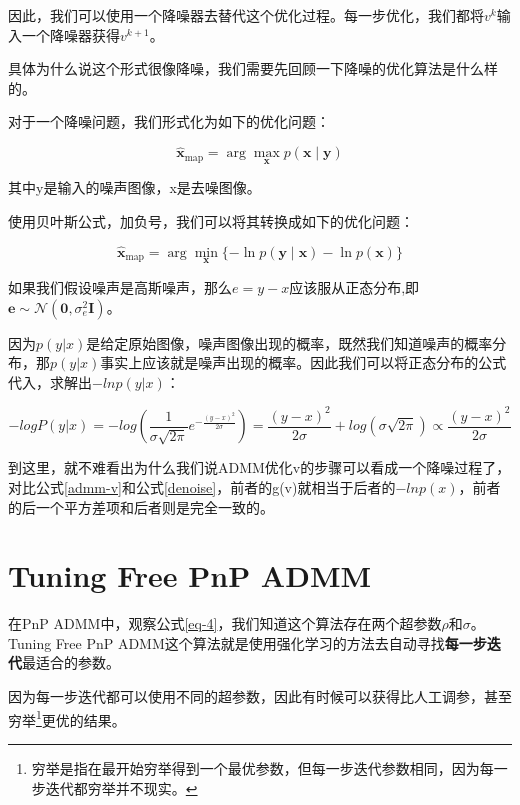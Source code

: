 \documentclass[10pt]{report}
\begin{document}
因此，我们可以使用一个降噪器去替代这个优化过程。每一步优化，我们都将$v^{k}$输入一个降噪器获得$v^{k+1}$。

具体为什么说这个形式很像降噪，我们需要先回顾一下降噪的优化算法是什么样的。

对于一个降噪问题，我们形式化为如下的优化问题：

\begin{equation}
\widehat{\boldsymbol{x}}_{\operatorname{map}}=\arg \max _{\boldsymbol{x}} p(\boldsymbol{x} \mid \boldsymbol{y})
\end{equation}

其中y是输入的噪声图像，x是去噪图像。

使用贝叶斯公式，加负号，我们可以将其转换成如下的优化问题：

\begin{equation}
\widehat{\boldsymbol{x}}_{\operatorname{map}}=\arg \min _{\boldsymbol{x}}\{-\ln p(\boldsymbol{y} \mid \boldsymbol{x})-\ln p(\boldsymbol{x})\}
\label{denoise}
\end{equation}

如果我们假设噪声是高斯噪声，那么$e=y-x$应该服从正态分布,即$\boldsymbol{e} \sim \mathcal{N}\left(\mathbf{0}, \sigma_{e}^{2} \boldsymbol{I}\right)$。

因为$p(y|x)$是给定原始图像，噪声图像出现的概率，既然我们知道噪声的概率分布，那$p(y|x)$事实上应该就是噪声出现的概率。因此我们可以将正态分布的公式代入，求解出$-ln p(y|x)$：

$$- logP(y|x) = -log(\frac{1}{\sigma\sqrt{2\pi}}e^{-\frac{(y-x)^2}{2\sigma}})=\frac{(y-x)^2}{2\sigma}+log(\sigma\sqrt{2\pi})\propto \frac{(y-x)^2}{2\sigma}$$

到这里，就不难看出为什么我们说ADMM优化v的步骤可以看成一个降噪过程了，对比公式\ref{admm-v}和公式\ref{denoise}，前者的g(v)就相当于后者的$-lnp(x)$，前者的后一个平方差项和后者则是完全一致的。

\section{Tuning Free PnP ADMM}

在PnP ADMM中，观察公式\ref{eq-4}，我们知道这个算法存在两个超参数$\rho$和$\sigma$。Tuning Free PnP ADMM\cite{wei2020tuning}这个算法就是使用强化学习的方法去自动寻找\textbf{每一步迭代}最适合的参数。

因为每一步迭代都可以使用不同的超参数，因此有时候可以获得比人工调参，甚至穷举\footnote{穷举是指在最开始穷举得到一个最优参数，但每一步迭代参数相同，因为每一步迭代都穷举并不现实。}更优的结果。
\end{document}

